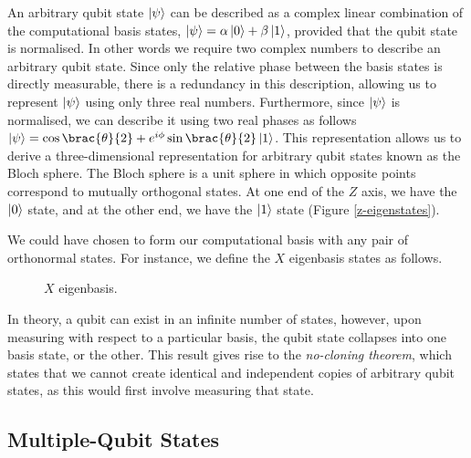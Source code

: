 An arbitrary qubit state $\ket\psi$ can be described as a complex linear combination of the computational basis states, $\ket\psi = \alpha\ket 0 + \beta\ket 1$, provided that the qubit state is normalised. In other words we require two complex numbers to describe an arbitrary qubit state. Since only the relative phase between the basis states is directly measurable, there is a redundancy in this description, allowing us to represent $\ket\psi$ using only three real numbers. Furthermore, since $\ket\psi$ is normalised, we can describe it using two real phases as follows $\ket\psi = \cos{\brac{\theta}{2}} + e^{i\phi} \sin{\brac{\theta}{2}} \ket 1$. This representation allows us to derive a three-dimensional representation for arbitrary qubit states known as the Bloch sphere. The Bloch sphere is a unit sphere in which opposite points correspond to mutually orthogonal states. At one end of the $Z$ axis, we have the $\ket 0$ state, and at the other end, we have the $\ket 1$ state (Figure \ref{z-eigenstates}).

We could have chosen to form our computational basis with any pair of orthonormal states. For instance, we define the $X$ eigenbasis states as follows.

\begin{figure}[H]
    \centering
    \begin{minipage}{.45\textwidth}
        \centering
    \end{minipage}%
    \begin{minipage}{0.45\textwidth}
        \centering
    \end{minipage}
    \caption{$X$ eigenbasis.}
    \label{x-eigenstates}
\end{figure}

In theory, a qubit can exist in an infinite number of states, however, upon measuring with respect to a particular basis, the qubit state collapses into one basis state, or the other. This result gives rise to the \textit{no-cloning theorem}, which states that we cannot create identical and independent copies of arbitrary qubit states, as this would first involve measuring that state.

\subsection{Multiple-Qubit States}

